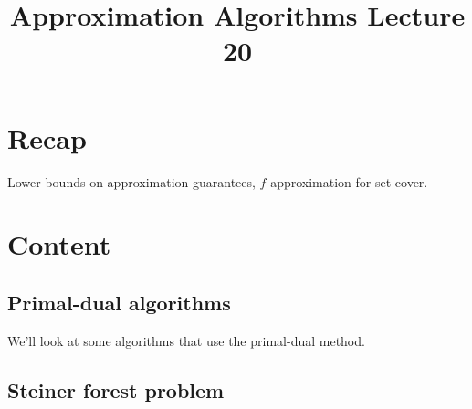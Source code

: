 \documentclass[a4paper]{article}
\title{\textbf{Approximation Algorithms Lecture 20}}
\date{}
\begin{document}
\maketitle
\tableofcontents

\section{Recap}

Lower bounds on approximation guarantees, $f$-approximation for set cover.

\section{Content}

\subsection{Primal-dual algorithms}

We'll look at some algorithms that use the primal-dual method.

\subsection{Steiner forest problem}
\end{document}
